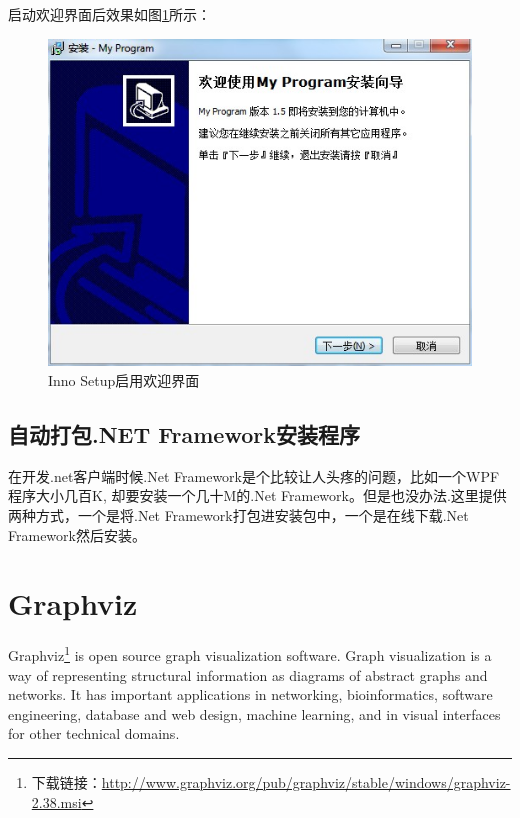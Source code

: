 \documentclass{book}
\begin{document}
启动欢迎界面后效果如图\ref{fig:InnoSetupEnableWelcomePage}所示：

\begin{figure}[htbp]
	\centering
	\includegraphics[scale=0.8]{InnoSetupEnableWelcomePage.jpg}
	\caption{Inno Setup启用欢迎界面}
	\label{fig:InnoSetupEnableWelcomePage}
\end{figure}



\subsection{自动打包.NET Framework安装程序}

在开发.net客户端时候.Net Framework是个比较让人头疼的问题，比如一个WPF程序大小几百K,
却要安装一个几十M的.Net Framework。但是也没办法.这里提供两种方式，一个是将.Net Framework打包进安装包中，一个是在线下载.Net Framework然后安装。

\section{Graphviz}

Graphviz\footnote{下载链接：\url{http://www.graphviz.org/pub/graphviz/stable/windows/graphviz-2.38.msi}} is open source graph visualization software. 
Graph visualization is a way of representing structural 
information as diagrams of abstract graphs and networks. 
It has important applications in networking, bioinformatics,
software engineering, database and web design, 
machine learning, and in visual interfaces for other technical domains.
\end{document}
